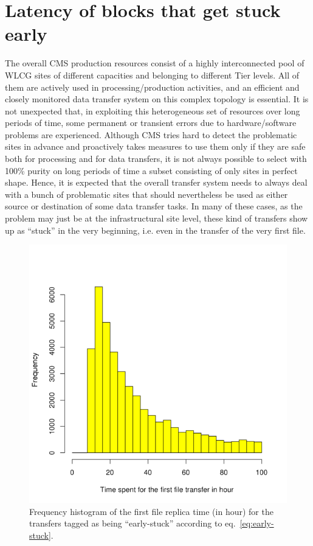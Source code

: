 \section{Latency of blocks that get stuck early}
\label{sec:earlystuck}

The overall CMS production resources consist of a highly
interconnected pool of WLCG sites of different capacities and
belonging to different Tier levels. All of them are actively used in
processing/production activities, and an efficient and closely
monitored data transfer system on this complex topology is
essential. It is not unexpected that, in exploiting this heterogeneous
set of resources over long periods of time, some permanent or
transient errors due to hardware/software problems are
experienced. Although CMS tries hard to detect the problematic sites
in advance and proactively takes measures to use them only if they are
safe both for processing and for data transfers, it is not always
possible to select with 100\% purity on long periods of time a subset
consisting of only sites in perfect shape. Hence, it is expected that
the overall transfer system needs to always deal with a bunch of
problematic sites that should nevertheless be used as either source or
destination of some data transfer tasks. In many of these cases, as
the problem may just be at the infrastructural site level, these kind
of transfers show up as “stuck” in the very beginning, i.e. even in
the transfer of the very first file.

\begin{figure}[htp]
\centering
\includegraphics{Figures/figure-71.pdf}
\caption{Frequency histogram of the first file replica time (in hour)
  for the transfers tagged as being ``early-stuck'' according to
  eq.~\ref{eq:early-stuck}.}\label{fig:figure-7.1}
\end{figure}

